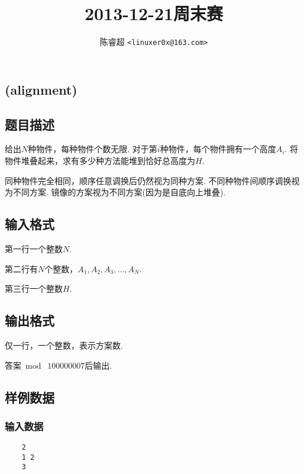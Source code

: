 \documentclass{article}
\begin{document}
\begin{CJK*}{UTF8}{gbsn}

    \setcounter{secnumdepth}{0}
    \setlength{\parindent}{2em}

    \title{2013-12-21周末赛}
    \author{陈睿超 \texttt{<linuxer0x@163.com>}}
    \date{}
    \maketitle
    \newpage






    \section*{(alignment)}
    \subsection*{题目描述}
    给出$N$种物件，每种物件个数无限. 对于第$i$种物件，每个物件拥有一个高度$A_i$. 将物件堆叠起来，求有多少种方法能堆到恰好总高度为$H$.

    同种物件完全相同，顺序任意调换后仍然视为同种方案. 不同种物件间顺序调换视为不同方案. 镜像的方案视为不同方案(因为是自底向上堆叠).


    \subsection*{输入格式}
    第一行一个整数$N$.

    第二行有$N$个整数，$A_1, A_2, A_3, \dots, A_N$.

    第三行一个整数$H$.

    \subsection*{输出格式}
    仅一行，一个整数，表示方案数.

    答案$\bmod \; 100000007$后输出.

    \subsection*{样例数据}
    \begin{spacing}{0.8}
    \begin{multicols}{3}
    \raggedcolumns

    \subsubsection*{输入数据}
    \begin{verbatim}
    2
    1 2
    3
    \end{verbatim}


\end{multicols}
\end{spacing}
\end{CJK*}
\end{document}
